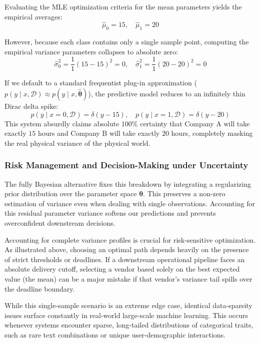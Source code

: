\documentclass{article}
\begin{document}
Evaluating the MLE optimization criteria for the mean parameters yields the empirical averages:
\begin{equation}
\hat{\mu}_0 = 15, \quad \hat{\mu}_1 = 20
\end{equation}

However, because each class contains only a single sample point, computing the empirical variance parameters collapses to absolute zero:
\begin{equation}
\hat{\sigma}_0^2 = \frac{1}{1}(15 - 15)^2 = 0, \quad \hat{\sigma}_1^2 = \frac{1}{1}(20 - 20)^2 = 0
\end{equation}

If we default to a standard frequentist plug-in approximation ($p(y \mid x, \mathcal{D}) \approx p(y \mid x, \hat{\boldsymbol{\theta}})$), the predictive model reduces to an infinitely thin Dirac delta spike:
\begin{equation}
p(y \mid x=0, \mathcal{D}) = \delta(y - 15), \quad p(y \mid x=1, \mathcal{D}) = \delta(y - 20)
\end{equation}
This system absurdly claims absolute $100\%$ certainty that Company A will take exactly $15$ hours and Company B will take exactly $20$ hours, completely masking the real physical variance of the physical world.

\subsubsection{Risk Management and Decision-Making under Uncertainty}
The fully Bayesian alternative fixes this breakdown by integrating a regularizing prior distribution over the parameter space $\boldsymbol{\theta}$. This preserves a non-zero estimation of variance even when dealing with single observations. Accounting for this residual parameter variance softens our predictions and prevents overconfident downstream decisions.



Accounting for complete variance profiles is crucial for risk-sensitive optimization. As illustrated above, choosing an optimal path depends heavily on the presence of strict thresholds or deadlines. If a downstream operational pipeline faces an absolute delivery cutoff, selecting a vendor based solely on the best expected value (the mean) can be a major mistake if that vendor's variance tail spills over the deadline boundary.

While this single-sample scenario is an extreme edge case, identical data-sparsity issues surface constantly in real-world large-scale machine learning. This occurs whenever systems encounter sparse, long-tailed distributions of categorical traits, such as rare text combinations or unique user-demographic interactions.
\end{document}

